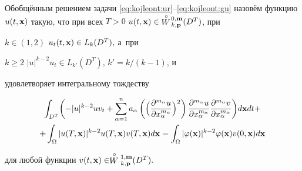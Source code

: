 \begin{definition} Обобщённым решением задачи \eqref{eq:kojleont:ur}--\eqref{eq:kojleont:gu} назовём функцию $u(t,{\bf x})$ такую, что  при всех $T>0$ $u(t,{\bf x})\in {\stackrel {\circ} {W}\!^{0,{\bf m}}_{k,{\bf

p}}}(D^T)$, при 

$k\in(1, 2)$ $u_t(t,{\bf x})\in L_k(D^T),$  а~при

$k\geq 2$ $|u|^{k-2}u_t\in L_{k'}(D^T)$, $k'={k}/(k-1)$, и

удовлетворяет интегральному тождеству

\begin{multline}

\label{eq:kojleont:intt}

\int_{D^{T}}

\biggl(-|u|^{k-2}uv_{t}+\sum_{\alpha=1}^{n} a_{\alpha}\left(\Bigl(\frac{\partial^{m_\alpha}u}{\partial x_\alpha^{m_\alpha}}\Bigr)^2\right)\frac{\partial^{m_\alpha}u}{\partial

x_\alpha^{m_\alpha}} \frac{\partial^{m_\alpha}v}{\partial

x_\alpha^{m_\alpha}} \biggr)d{\bf x}dt+

\\

+\int_ \Omega |u(T,{\bf x})|^{k-2}u(T,{\bf x}) v(T,{\bf

x})d{\bf x}=\int_ \Omega |\varphi({\bf

x})|^{k-2}\varphi({\bf x}) v(0,{\bf x})d{\bf x}

\end{multline}

для любой функции $v(t,{\bf x}) \in \stackrel{\circ}{W}{_{k,{\bf

p}}^{1,{\bf m}}}(D^T).$



\end{definition}



\smallskip




